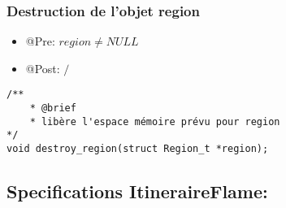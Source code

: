 
\subsubsection{Destruction de l'objet region}

\begin{itemize}
    \item @Pre: $region \ne NULL$
    \item @Post: $\slash$ 
\end{itemize}

\begin{lstlisting}
/**
    * @brief 
    * libère l'espace mémoire prévu pour region
*/
void destroy_region(struct Region_t *region);
\end{lstlisting}

\pagebreak


\subsection{Specifications ItineraireFlame:}


